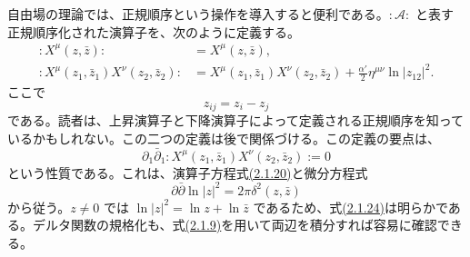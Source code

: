 自由場の理論では、正規順序という操作を導入すると便利である。$:\mathcal A:$ と表す正規順序化された演算子を、次のように定義する。
\begin{align}
:X^\mu(z,\bar z):&=X^\mu(z,\bar z),
\tag{2.1.21a}\label{eq:2.1.21a}\\
:X^\mu(z_1,\bar z_1)X^\nu(z_2,\bar z_2):
&=X^\mu(z_1,\bar z_1)X^\nu(z_2,\bar z_2)
+\frac{\alpha'}2\eta^{\mu\nu}\ln|z_{12}|^2.
\tag{2.1.21b}\label{eq:2.1.21b}
\end{align}
ここで
\begin{equation}
z_{ij}=z_i-z_j
\tag{2.1.22}\label{eq:2.1.22}
\end{equation}
である。読者は、上昇演算子と下降演算子によって定義される正規順序を知っているかもしれない。この二つの定義は後で関係づける。この定義の要点は、
\begin{equation}
\partial_1\bar\partial_1:X^\mu(z_1,\bar z_1)X^\nu(z_2,\bar z_2):=0
\tag{2.1.23}\label{eq:2.1.23}
\end{equation}
という性質である。これは、演算子方程式\hyperref[eq:2.1.20]{(2.1.20)}と微分方程式
\begin{equation}
\partial\bar\partial\ln|z|^2=2\pi\delta^2(z,\bar z)
\tag{2.1.24}\label{eq:2.1.24}
\end{equation}
から従う。$z\ne0$ では $\ln|z|^2=\ln z+\ln\bar z$ であるため、式\hyperref[eq:2.1.24]{(2.1.24)}は明らかである。デルタ関数の規格化も、式\hyperref[eq:2.1.9]{(2.1.9)}を用いて両辺を積分すれば容易に確認できる。

\label{sec:2.2}

